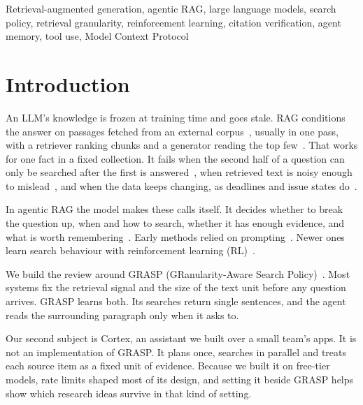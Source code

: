 \documentclass[conference]{IEEEtran}
\begin{document}
\begin{IEEEkeywords}
Retrieval-augmented generation, agentic RAG, large language models, search policy, retrieval granularity, reinforcement learning, citation verification, agent memory, tool use, Model Context Protocol
\end{IEEEkeywords}

\section{Introduction}

An LLM's knowledge is frozen at training time and goes stale. RAG conditions the answer on passages fetched from an external corpus~\cite{lewis2020rag}, usually in one pass, with a retriever ranking chunks and a generator reading the top few~\cite{gao2023ragsurvey}. That works for one fact in a fixed collection. It fails when the second half of a question can only be searched after the first is answered~\cite{trivedi2023ircot,press2023selfask}, when retrieved text is noisy enough to mislead~\cite{shi2023distracted,liu2024lost}, and when the data keeps changing, as deadlines and issue states do~\cite{vu2024freshllms}.

In agentic RAG the model makes these calls itself. It decides whether to break the question up, when and how to search, whether it has enough evidence, and what is worth remembering~\cite{singh2025agenticrag}. Early methods relied on prompting~\cite{yao2023react,trivedi2023ircot,jiang2023flare}. Newer ones learn search behaviour with reinforcement learning (RL)~\cite{jin2025searchr1,luo2025maragr1}.

We build the review around GRASP (GRanularity-Aware Search Policy)~\cite{gandhi2026grasp}. Most systems fix the retrieval signal and the size of the text unit before any question arrives. GRASP learns both. Its searches return single sentences, and the agent reads the surrounding paragraph only when it asks to.

Our second subject is Cortex, an assistant we built over a small team's apps. It is not an implementation of GRASP. It plans once, searches in parallel and treats each source item as a fixed unit of evidence. Because we built it on free-tier models, rate limits shaped most of its design, and setting it beside GRASP helps show which research ideas survive in that kind of setting.
\end{document}
